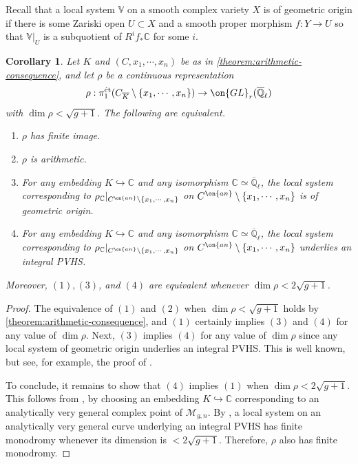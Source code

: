 \documentclass[12 pt]{amsart}
\theoremstyle{plain}
\newtheorem{corollary}[subsubsection]{Corollary}
\theoremstyle{definition}
\theoremstyle{remark}
\numberwithin{equation}{section}
\begin{document}
Recall that a local system $\mathbb V$ on a smooth complex variety $X$ is of geometric origin if there is
some Zariski open $U \subset X$ and a smooth proper morphism $f: Y \to U$ so that
$\mathbb V|_U$ is a subquotient of $R^i f_* \mathbb C$ for some $i$.
\begin{corollary}
	\label{corollary:fontaine-mazur}
	Let $K$ and $(C, x_1, \cdots, x_n)$ be as in
	\autoref{theorem:arithmetic-consequence}, 
	and let
	$\rho$ be a continuous representation 
\begin{align*}
\rho: \pi_1^{\text{\'et}}(C_{\overline{K}}\setminus\{x_1, \cdots, x_n\})\to \on{GL}_r(\overline{\mathbb{Q}}_\ell) 
\end{align*}
with $\dim \rho < \sqrt{g+1}$. The following are equivalent.
	\begin{enumerate}
		\item $\rho$ has finite image.
		\item $\rho$ is arithmetic.
		\item For any embedding $K\hookrightarrow \mathbb{C}$ and any isomorphism $\mathbb{C}\simeq \overline{\mathbb{Q}}_\ell$, the local system corresponding to $\rho_\mathbb{C}|_{C^{\on{an}}\setminus\{x_1,
	\cdots, x_n\}}$ on $C^{\on{an}}\setminus\{x_1,
	\cdots, x_n\}$ is of geometric
			origin. 
		\item For any embedding $K\hookrightarrow \mathbb{C}$ and any isomorphism $\mathbb{C}\simeq \overline{\mathbb{Q}}_\ell$, the local system corresponding to $\rho_\mathbb{C}|_{C^{\on{an}}\setminus\{x_1,
	\cdots, x_n\}}$ on $C^{\on{an}}\setminus\{x_1,
	\cdots, x_n\}$ underlies an
			integral PVHS.
	\end{enumerate}
	Moreover, $(1), (3)$, and $(4)$ are equivalent whenever $\dim \rho <
	2\sqrt{g+1}$.
\end{corollary}
\begin{proof}
The equivalence of $(1)$ and $(2)$ when $\dim \rho <\sqrt{g+1}$ holds by
	\autoref{theorem:arithmetic-consequence}, and $(1)$
	certainly implies $(3)$ and $(4)$ for any value of $\dim \rho$.
	Next, $(3)$ implies $(4)$ for any value of $\dim \rho$ since any local system of geometric origin
	underlies an integral PVHS. This is well known, but see, for example, the proof of
	\cite[Corollary 1.2.7]{LL:geometric-local-systems}.

	To conclude, it remains to show that $(4)$ implies $(1)$ when $\dim \rho
	< 2\sqrt{g+1}$.
	This follows from \cite[Corollary 1.2.7]{LL:geometric-local-systems},
	by choosing an embedding $K\hookrightarrow \mathbb{C}$ corresponding to an analytically very general complex point of $\mathscr{M}_{g,n}$.
	By \cite[Corollary 1.2.7]{LL:geometric-local-systems},
	 a local system on an analytically very general curve underlying an integral PVHS has finite monodromy whenever its dimension is
	$< 2\sqrt{g+1}$.
	Therefore, $\rho$ also has finite monodromy.
\end{proof}
\end{document}
